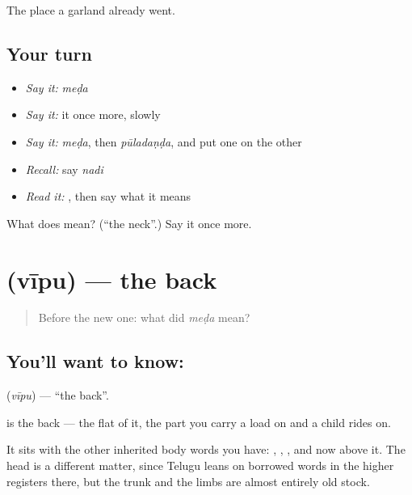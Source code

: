 \begin{grammarlens}[title={What you've built}]
The place a garland already went.
\end{grammarlens}

\subsection*{Your turn}
\begin{itemize}
\raggedright
  \item \emph{Say it:} \emph{meḍa}
  \item \emph{Say it:} it once more, slowly
  \item \emph{Say it:} \emph{meḍa}, then \emph{pūladaṇḍa}, and put one on the other
  \item \emph{Recall:} say \emph{nadi}
  \item \emph{Read it:} \textbf{}, then say what it means
\end{itemize}

\begin{tcolorbox}[breakable,colback=teal!4,colframe=teal!35!black,title={Before you move on}]
What does  mean? (\textquotedblleft{}the neck\textquotedblright{}.) Say it once more.
\end{tcolorbox}
\section[\texorpdfstring{\te{వీపు} (vīpu)}{వీపు (vīpu)}]{ (vīpu) — the back}

\label{lesson:TE-C57-back}



\begin{quote}
Before the new one: what did \emph{meḍa} mean?
\end{quote}

\subsection*{You'll want to know: }
\textbf{} (\emph{vīpu}) — \textquotedblleft{}the back\textquotedblright{}.

 is the back — the flat of it, the part you carry a load on and a child rides on.

It sits with the other inherited body words you have: , , , and now  above it. The head is a different matter, since Telugu leans on borrowed words in the higher registers there, but the trunk and the limbs are almost entirely old stock.

